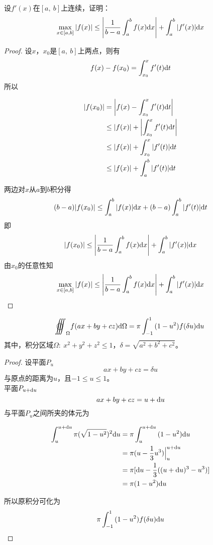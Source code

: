 \begin{proposition}
    
    设$f'(x)$在$[a,\ b]$上连续，证明：
    $$\max_{x\in[a,b]}{|f(x)|} \leq \left|\dfrac{1}{b - a}\int_{a}^{b}{f(x)}\mathrm{d} x\right| + \int_{a}^{b}{|f'(x)|}\mathrm{d} x$$

\end{proposition}

\begin{proof}

    设$x$，$x_0$是$[a,\ b]$上两点，则有
    $$f(x) - f(x_0) = \int_{x_0}^{x}{f'(t)}\mathrm{d} t$$
    所以

    \begin{align*}
        |f(x_0)| & = \left|f(x) - \int_{x_0}^{x}{f'(t)}\mathrm{d} t \right| \\
        & \leq |f(x)| + \left|\int_{x_0}^{x}{f'(t)}\mathrm{d} t \right| \\
        & \leq |f(x)| +  \int_{x_0}^{x}{|f'(t)|}\mathrm{d} t \\
        & \leq |f(x)| +  \int_{a}^{b}{|f'(t)|}\mathrm{d} t \\
    \end{align*}

    两边对$x$从$a$到$b$积分得
    $$(b - a)|f(x_0)| \leq \int_{a}^{b}{|f(x)|}\mathrm{d} x + (b - a)\int_{a}^{b}{|f'(t)|}\mathrm{d} t$$
    即
    $$|f(x_0)| \leq \left|\dfrac{1}{b - a}\int_{a}^{b}{f(x)}\mathrm{d} x\right| + \int_{a}^{b}{|f'(x)|}\mathrm{d} x$$
    由$x_0$的任意性知
    $$\max_{x\in[a,b]}{|f(x)|} \leq \left|\dfrac{1}{b - a}\int_{a}^{b}{f(x)}\mathrm{d} x\right| + \int_{a}^{b}{|f'(x)|}\mathrm{d} x$$
    
\end{proof}

\begin{theorem}

    $$\oooint_{\Omega}{f(ax + by + cz)}\diff \Omega = \pi \int_{-1}^{1}{(1 - u^2)f(\delta u)}\diff u$$
    其中，积分区域$\Omega:\ x^2 + y^2 + z^2 \leq 1$，$\delta = \sqrt{a^2 + b^2 + c^2}$。

\end{theorem}

\begin{proof}

    设平面$P_u$
    $$ax + by + cz = \delta u$$
    与原点的距离为$u$，且$-1 \leq u \leq 1$。\\
    平面$P_{u + \mathrm{d} u}$
    $$ax + by + cz = u + \mathrm{d} u$$
    与平面$P_u$之间所夹的体元为
    
    \begin{align*}
        \int_{u}^{u + \mathrm{d} u}{\pi (\sqrt{1 - u^2})^2}\mathrm{d} u & = \pi \int_{u}^{u + \mathrm{d} u}{(1 - u^2)}\mathrm{d} u \\
        & = \pi (u - \dfrac{1}{3}u^3) \Big|_{u}^{u + \mathrm{d} u} \\
        & = \pi [\mathrm{d} u - \dfrac{1}{3}((u + \mathrm{d} u)^3 - u^3)] \\
        & = \pi (1 - u^2)\mathrm{d} u
    \end{align*}

    所以原积分可化为
    $$\pi \int_{-1}^{1}{(1 - u^2)f(\delta u)}\mathrm{d} u$$

\end{proof}

